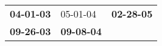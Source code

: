 \begin{supertabular}{p{0.33\columnwidth}p{0.33\columnwidth}p{0.33\columnwidth}}
 \textbf{04-01-03\textsuperscript{}} &           05-01-04\textsuperscript{} &  \textbf{02-28-05\textsuperscript{}} \\
 \textbf{09-26-03\textsuperscript{}} &  \textbf{09-08-04\textsuperscript{}} &                                      \\
\end{supertabular}
